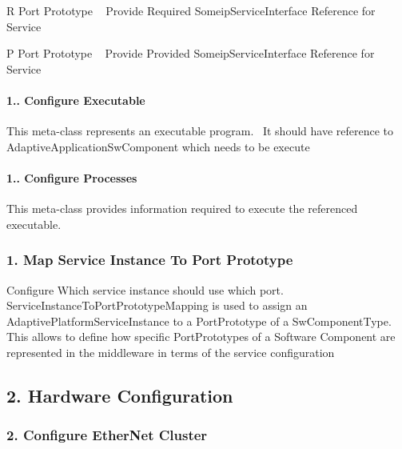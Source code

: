 \begin{DoxyItemize}
\item R Port Prototype ~\newline
 Provide Required Someip\+Service\+Interface Reference for Service
\item P Port Prototype ~\newline
 Provide Provided Someip\+Service\+Interface Reference for Service
\end{DoxyItemize}



\paragraph*{1.. Configure Executable}

This meta-\/class represents an executable program.~\newline
 It should have reference to Adaptive\+Application\+Sw\+Component which needs to be execute



\paragraph*{1.. Configure Processes}

This meta-\/class provides information required to execute the referenced executable.



\subsubsection*{1. Map Service Instance To Port Prototype}

Configure Which service instance should use which port. Service\+Instance\+To\+Port\+Prototype\+Mapping is used to assign an Adaptive\+Platform\+Service\+Instance to a Port\+Prototype of a Sw\+Component\+Type. This allows to define how specific Port\+Prototypes of a Software Component are represented in the middleware in terms of the service configuration



\subsection*{2. Hardware Configuration}

\subsubsection*{2. Configure Ether\+Net Cluster}

